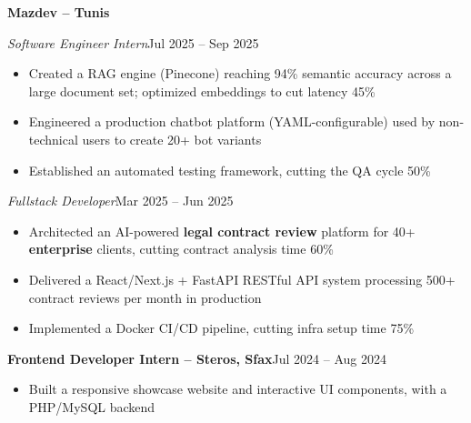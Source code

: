 \documentclass[10pt,a4paper]{article}
\newcommand{\entry}[2]{\vspace{1pt}\noindent\textbf{#1}\hfill{\color{muted}#2}\par}
\newcommand{\subentry}[2]{\noindent\textit{#1}\hfill{\color{muted}#2}\par}
\begin{document}
\entry{Mazdev -- Tunis}{}
\subentry{Software Engineer Intern}{Jul 2025 -- Sep 2025}
\begin{itemize}
  \item Created a RAG engine (Pinecone) reaching 94\% semantic accuracy across a large document set; optimized embeddings to cut latency 45\%
  \item Engineered a production chatbot platform (YAML-configurable) used by non-technical users to create 20+ bot variants
  \item Established an automated testing framework, cutting the QA cycle 50\%
\end{itemize}
\subentry{Fullstack Developer}{Mar 2025 -- Jun 2025}
\begin{itemize}
  \item Architected an AI-powered \textbf{legal contract review} platform for 40+ \textbf{enterprise} clients, cutting contract analysis time 60\%
  \item Delivered a React/Next.js + FastAPI RESTful API system processing 500+ contract reviews per month in production
  \item Implemented a Docker CI/CD pipeline, cutting infra setup time 75\%
\end{itemize}

\entry{Frontend Developer Intern -- Steros, Sfax}{Jul 2024 -- Aug 2024}
\begin{itemize}
  \item Built a responsive showcase website and interactive UI components, with a PHP/MySQL backend
\end{itemize}
\end{document}

